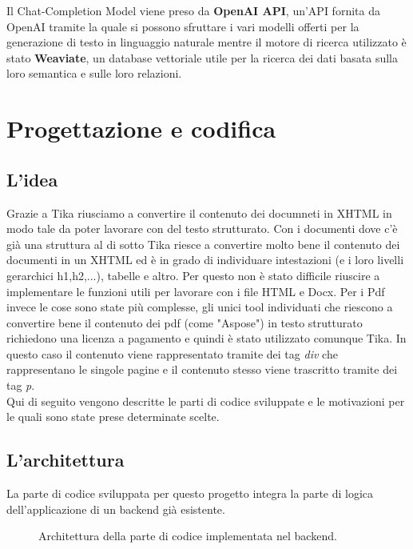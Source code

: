 Il Chat-Completion Model viene preso da \textbf{OpenAI API}, un'API fornita da OpenAI tramite la quale si possono sfruttare i vari modelli offerti per la generazione di testo in linguaggio naturale mentre il motore di ricerca utilizzato 
è stato \textbf{Weaviate}, un database vettoriale utile per la ricerca dei dati basata sulla loro semantica e sulle loro relazioni. 

\section{Progettazione e codifica}

\subsection{L'idea}
\label{subsec:ideaProg}
Grazie a Tika riusciamo a convertire il contenuto dei documneti in XHTML in modo tale da poter lavorare con del testo strutturato.
Con i documenti dove c'è già una struttura al di sotto Tika riesce a convertire molto bene il contenuto dei documenti in un XHTML ed è in grado di individuare intestazioni (e i loro livelli gerarchici h1,h2,...), tabelle e altro.
Per questo non è stato difficile riuscire a implementare le funzioni utili per lavorare con i file HTML e Docx.
Per i Pdf invece le cose sono state più complesse, gli unici tool individuati che riescono a convertire bene il contenuto dei pdf (come "Aspose") in testo strutturato richiedono una licenza a pagamento e quindi è stato utilizzato comunque Tika.
In questo caso il contenuto viene rappresentato tramite dei tag \emph{div} che rappresentano le singole pagine e il contenuto stesso viene trascritto tramite dei tag \emph{p}. \\

\noindent Qui di seguito vengono descritte le parti di codice sviluppate e le motivazioni per le quali sono state prese determinate scelte.

\subsection{L'architettura}

\label{sec:progettazione-codifica}
La parte di codice sviluppata per questo progetto integra la parte di logica dell'applicazione di un backend già esistente.

\begin{figure}[!h]
    \centering
    \caption{Architettura della parte di codice implementata nel backend.}
\end{figure}

